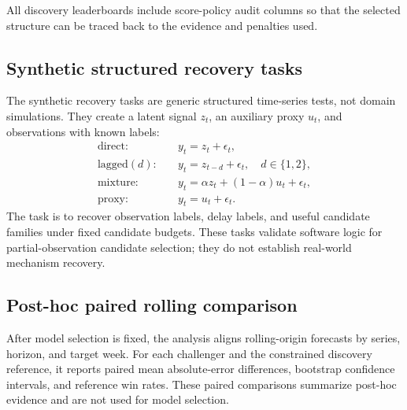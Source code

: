 All discovery leaderboards include score-policy audit columns so that the
selected structure can be traced back to the evidence and penalties used.

\subsection{Synthetic structured recovery tasks}

The synthetic recovery tasks are generic structured time-series tests, not
domain simulations. They create a latent signal $z_t$, an auxiliary proxy
$u_t$, and observations with known labels:
\[
\begin{aligned}
\mathrm{direct}: \quad & y_t = z_t + \epsilon_t,\\
\mathrm{lagged}(d): \quad & y_t = z_{t-d} + \epsilon_t,\quad d\in\{1,2\},\\
\mathrm{mixture}: \quad & y_t = \alpha z_t + (1-\alpha)u_t + \epsilon_t,\\
\mathrm{proxy}: \quad & y_t = u_t + \epsilon_t.
\end{aligned}
\]
The task is to recover observation labels, delay labels, and useful candidate
families under fixed candidate budgets. These tasks validate software logic
for partial-observation candidate selection; they do not establish real-world
mechanism recovery.

\subsection{Post-hoc paired rolling comparison}

After model selection is fixed, the analysis aligns rolling-origin forecasts
by series, horizon, and target week. For each challenger and the constrained
discovery reference, it reports paired mean absolute-error differences,
bootstrap confidence intervals, and reference win rates. These paired
comparisons summarize post-hoc evidence and are not used for model selection.
